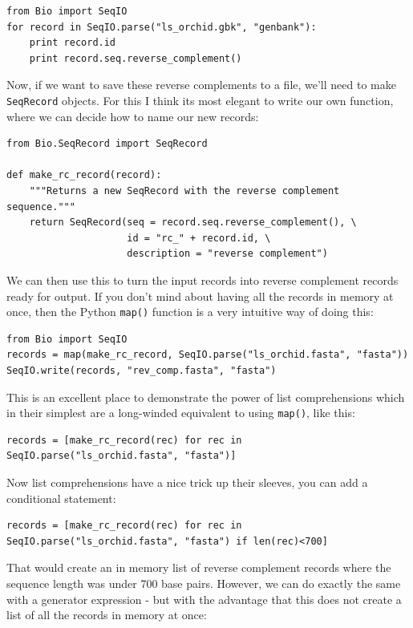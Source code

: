 \documentclass{report}
\begin{document}
\begin{verbatim}
from Bio import SeqIO
for record in SeqIO.parse("ls_orchid.gbk", "genbank"):
    print record.id
    print record.seq.reverse_complement()
\end{verbatim}

Now, if we want to save these reverse complements to a file, we'll need to make \verb|SeqRecord| objects.
For this I think its most elegant to write our own function, where we can decide how to name our
new records:

\begin{verbatim}
from Bio.SeqRecord import SeqRecord

def make_rc_record(record):
    """Returns a new SeqRecord with the reverse complement sequence."""
    return SeqRecord(seq = record.seq.reverse_complement(), \
                     id = "rc_" + record.id, \
                     description = "reverse complement")
\end{verbatim}

We can then use this to turn the input records into reverse complement records ready for output.  If you don't mind about having all the records in memory at once, then the Python \verb|map()| function is a very intuitive way of doing this:

\begin{verbatim}
from Bio import SeqIO
records = map(make_rc_record, SeqIO.parse("ls_orchid.fasta", "fasta"))
SeqIO.write(records, "rev_comp.fasta", "fasta")
\end{verbatim}

This is an excellent place to demonstrate the power of list comprehensions which in their simplest are a long-winded equivalent to using \verb|map()|, like this:

\begin{verbatim}
records = [make_rc_record(rec) for rec in SeqIO.parse("ls_orchid.fasta", "fasta")]
\end{verbatim}

\noindent Now list comprehensions have a nice trick up their sleeves, you can add a conditional statement:

\begin{verbatim}
records = [make_rc_record(rec) for rec in SeqIO.parse("ls_orchid.fasta", "fasta") if len(rec)<700]
\end{verbatim}

That would create an in memory list of reverse complement records where the sequence length was under 700 base pairs. However, we can do exactly the same with a generator expression - but with the advantage that this does not create a list of all the records in memory at once:
\end{document}
